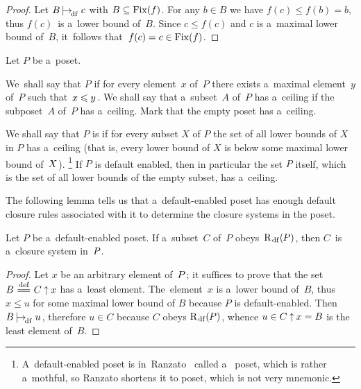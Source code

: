 \documentclass[11pt,letterpaper]{article}
\renewcommand{\thmskip}{\bigskip}
\renewcommand{\interskip}{\medskip}
\begin{document}
\interskip

\begin{proof}
Let $B\mspace{-2mu}\mathrel{{{|}\mspace{-3.5mu}{\rightarrow}}_{\!\mathrm{df}}}c$ with $B\subseteq\mathop{\smash{\mathrm{Fix}}}\nolimits(f)\mspace{1mu}$.
For any $b\in B$ we have $f(c)\leq f(b) = b$, thus $f(c)$~is a~lower bound of~$B$.
Since $c\leq f(c)$ and $c$ is a~maximal lower bound of~$B$,
it~follows that~$f(c)=c\in\mathop{\smash{\mathrm{Fix}}}\nolimits(f)\mspace{1mu}$.
\end{proof}


\thmskip

Let $P$ be a~poset.

We~shall say that $P$ 
if for every element~$x$ of~$P$ there exists a~maximal element~$y$ of~$P$
	such that~$x\leqslant y\mspace{1mu}$.
We shall say that a~subset~$A$ of~$P$ has a~ceiling
	if the subposet~$A$ of~$P$ has a~ceiling.
Mark that the empty poset has a~ceiling.

We shall say that $P$ is 
if for every subset $X$ of $P$ the set of all lower bounds of $X$ in $P$ has a~ceiling
	(that is, every lower bound of $X$ is below some maximal lower bound of~$X\mspace{1mu}$).%
%
\footnote{A~default-enabled poset is in~Ranzato~\cite{ranzato}
called a~ poset,
which is rather a~mothful, so Ranzato shortens it to  poset,
which is not very mnemonic.}
%
If $P$ is default enabled, then in particular the set $P$ itself,
	which is the set of all lower bounds of the empty subset,
has a~ceiling.

\txtskip

The following lemma tells us that a~default-enabled poset
	has enough default closure rules associated with it
to determine the closure systems in the poset.

\thmskip

\begin{lemma}\label{lem:dflt-enabled-P-has-enough-dflt-clrules}
Let\/ $P$ be a~default-enabled poset.
If a~subset\/~$C$ of\/~$P$ obeys\/~$\mathrm{R}_{\mspace{2mu}\mathrm{df}}(\mspace{-1mu} P)$,
	then\/ $C$~is a~closure system in\/~$P\mspace{-1mu}$.
\end{lemma}

\interskip

\begin{proof}
Let $x$ be an arbitrary element of~$P\mspace{1mu}$;
it suffices to prove that the set $B\mathrel{\overset{\text{def}}{\mspace{1mu}=\!=\mspace{1mu}}}C\mathbin{\uparrow} x$ has a~least element.
The~ele\-ment~$x$ is a~lower bound of~$B$,
thus $x\leq u$ for some maximal lower bound of $B$ because $P$ is default-enabled.
Then $B\mspace{-2mu}\mathrel{{{|}\mspace{-3.5mu}{\rightarrow}}_{\!\mathrm{df}}}u\mspace{2mu}$,
therefore $u\in C$ because $C$ obeys $\mathrm{R}_{\mspace{2mu}\mathrm{df}}(\mspace{-1mu} P)\mspace{1mu}$,
whence $u\in C\mathbin{\uparrow} x = B$ is the least element of~$B$.
\end{proof}
\end{document}
